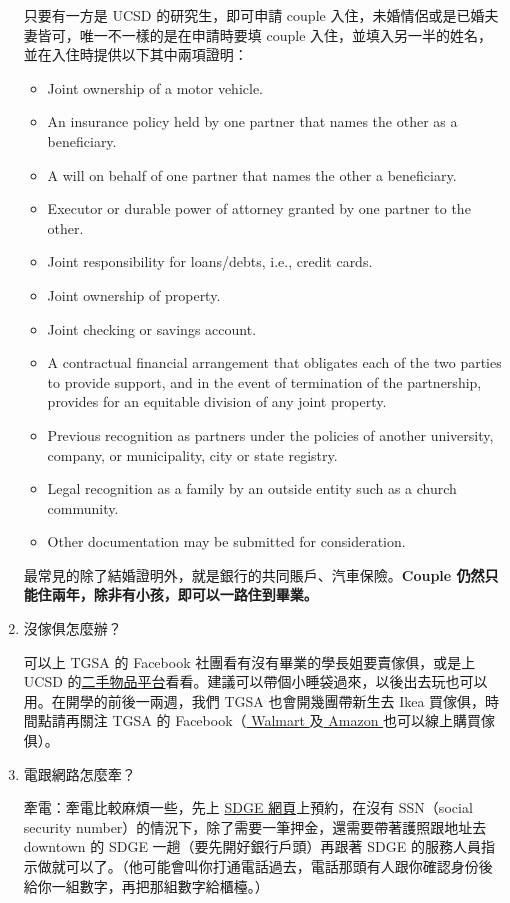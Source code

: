 \documentclass[10pt,a4paper]{book}
\begin{document}
\begin{CJK}{UTF8}{bkai}
\begin{enumerate}
只要有一方是 UCSD 的研究生，即可申請 couple 入住，未婚情侶或是已婚夫妻皆可，唯一不一樣的是在申請時要填 couple 入住，並填入另一半的姓名，並在入住時提供以下其中兩項證明：
\begin{itemize}
\item Joint ownership of a motor vehicle.
\item An insurance policy held by one partner that names the other as a beneficiary.
\item A will on behalf of one partner that names the other a beneficiary.
\item Executor or durable power of attorney granted by one partner to the other.
\item Joint responsibility for loans/debts, i.e., credit cards.
\item Joint ownership of property.
\item Joint checking or savings account.
\item A contractual financial arrangement that obligates each of the two parties to provide support, and in the event of termination of the partnership, provides for an equitable division of any joint property.
\item Previous recognition as partners under the policies of another university, company, or municipality, city or state registry.
\item Legal recognition as a family by an outside entity such as a church community.
\item Other documentation may be submitted for consideration.
\end{itemize}
最常見的除了結婚證明外，就是銀行的共同賬戶、汽車保險。\textbf{Couple 仍然只能住兩年，除非有小孩，即可以一路住到畢業。}

\item 沒傢俱怎麼辦？

可以上 TGSA 的 Facebook 社團看有沒有畢業的學長姐要賣傢俱，或是上 UCSD 的\href{https://www.facebook.com/groups/UCSDfreeforsale/}{二手物品平台}看看。建議可以帶個小睡袋過來，以後出去玩也可以用。在開學的前後一兩週，我們 TGSA 也會開幾團帶新生去 Ikea 買傢俱，時間點請再關注 TGSA 的 Facebook（\href{http://www.walmart.com/}{ Walmart }及\href{http://www.amazon.com}{ Amazon }也可以線上購買傢俱）。

\item 電跟網路怎麼牽？

牽電：牽電比較麻煩一些，先上 \href{www.sdge.com}{SDGE 網頁}上預約，在沒有 SSN（social security number）的情況下，除了需要一筆押金，還需要帶著護照跟地址去 downtown 的 SDGE 一趟（要先開好銀行戶頭）再跟著 SDGE 的服務人員指示做就可以了。（他可能會叫你打通電話過去，電話那頭有人跟你確認身份後給你一組數字，再把那組數字給櫃檯。）


\end{enumerate}
\end{CJK}
\end{document}
